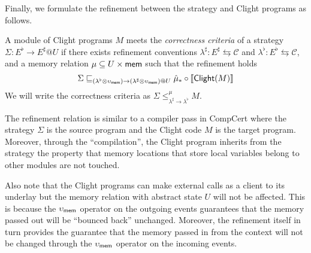 \documentclass[acmsmall,review,anonymous]{acmart}\settopmatter{printfolios=true,printccs=false,printacmref=false}
\begin{document}
Finally, we formulate
the refinement between the strategy and Clight programs
as follows.

\begin{definition}
  A module of Clight programs $M$ meets
  the \emph{correctness criteria} of a strategy
  $\Sigma: E^\flat \rightarrow E^\sharp @ U$
  if there exists
  refinement conventions
  $\lambda^\sharp: E^\sharp \leftrightarrows \mathcal{C}$
  and $\lambda^\flat: E^\flat \leftrightarrows \mathcal{C}$,
  and a memory relation $\mu \subseteq U \times  \mathsf{mem} $
  such that the refinement holds
  \[
    \Sigma \sqsubseteq_{(\lambda^\flat \otimes \upsilon_{ \mathsf{mem} })
      \rightarrow (\lambda^\sharp \otimes \upsilon_{ \mathsf{mem} })@U}
    \hat{\mu}_* \circ \llbracket  \mathsf{Clight} (M) \rrbracket
  \]
  We will write the correctness criteria
  as $\Sigma \le^\mu_{\lambda^\sharp \rightarrow \lambda^\flat} M$.
\end{definition}

The refinement relation
is similar to a compiler pass in CompCert
where the strategy $\Sigma$ is the source program
and the Clight code $M$ is the target program.
Moreover, through the ``compilation'',
the Clight program inherits
from the strategy the property
that memory locations that store local variables
belong to other modules are not touched.

Also note that the Clight programs
can make external calls as a client to its underlay
but the memory relation with abstract state $U$
will not be affected.
This is because
the $\upsilon_{ \mathsf{mem} }$ operator
on the outgoing events
guarantees that
the memory passed out
will be ``bounced back'' unchanged.
Moreover,
the refinement itself in turn
provides the guarantee
that the memory passed in from the context
will not be changed
through the $\upsilon_{ \mathsf{mem} }$ operator
on the incoming events.
\end{document}
